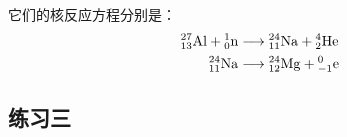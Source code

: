\begin{enumerate}
    \begin{solution}
        它们的核反应方程分别是：
\[\begin{split}
    \atom{Al}{27}{13}+\atom{n}{1}{0}&\longrightarrow \atom{Na}{24}{11}+\atom{He}{4}{2}\\
    \atom{Na}{24}{11} &\longrightarrow \atom{Mg}{24}{12}+\atom{e}{0}{-1}
\end{split}\]  
    \end{solution}
\end{enumerate}





\subsection{练习三}

